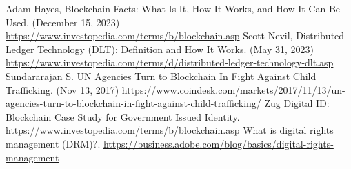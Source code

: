 \singlespace
{}
\begin{thebibliography}{}
   Adam Hayes, Blockchain Facts: What Is It, How It Works, and How It Can Be Used. (December 15, 2023) \url{https://www.investopedia.com/terms/b/blockchain.asp}
   Scott Nevil, Distributed Ledger Technology (DLT): Definition and How It Works. (May 31, 2023) \url{https://www.investopedia.com/terms/d/distributed-ledger-technology-dlt.asp}
    Sundararajan S. UN Agencies Turn to Blockchain In Fight Against Child Trafficking. (Nov 13, 2017)  \url{https://www.coindesk.com/markets/2017/11/13/un-agencies-turn-to-blockchain-in-fight-against-child-trafficking/}
   Zug Digital ID: Blockchain Case Study for Government Issued Identity.  \url{https://www.investopedia.com/terms/b/blockchain.asp}
   What is digital rights management (DRM)?.  \url{https://business.adobe.com/blog/basics/digital-rights-management}

\end{thebibliography}
